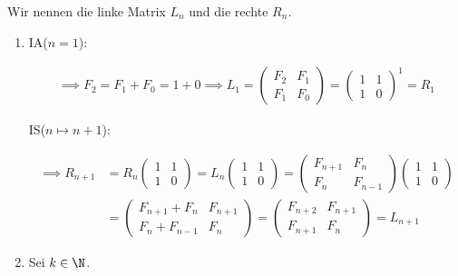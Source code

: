\begin{solution}

Wir nennen die linke Matrix $L_n$ und die rechte $R_n$.

\begin{enumerate}[label = \alph*.]

  \item IA($n = 1$):

  \begin{align*}
    \implies
    F_2 = F_1 + F_0 = 1 + 0
    \implies
    L_1 =
    \begin{pmatrix}
      F_2 & F_1 \\
      F_1 & F_0
    \end{pmatrix}
    =
    \begin{pmatrix}
      1 & 1 \\
      1 & 0
    \end{pmatrix}^1
    = R_1
  \end{align*}

  IS($n \mapsto n + 1$):

  \begin{align*}
    \implies
    R_{n+1}
    &=
    R_n
    \begin{pmatrix}
      1 & 1 \\
      1 & 0
    \end{pmatrix}
    =
    L_n
    \begin{pmatrix}
      1 & 1 \\
      1 & 0
    \end{pmatrix}
    =
    \begin{pmatrix}
      F_{n+1} & F_n \\
      F_n     & F_{n-1}
    \end{pmatrix}
    \begin{pmatrix}
      1 & 1 \\
      1 & 0
    \end{pmatrix} \\
    &=
    \begin{pmatrix}
      F_{n+1} + F_n & F_{n+1} \\
      F_n + F_{n-1} & F_n
    \end{pmatrix}
    =
    \begin{pmatrix}
      F_{n+2} & F_{n+1} \\
      F_{n+1} & F_n
    \end{pmatrix}
    =
    L_{n+1}
  \end{align*}

  \item Sei $k \in \N$.


\end{enumerate}
\end{solution}
